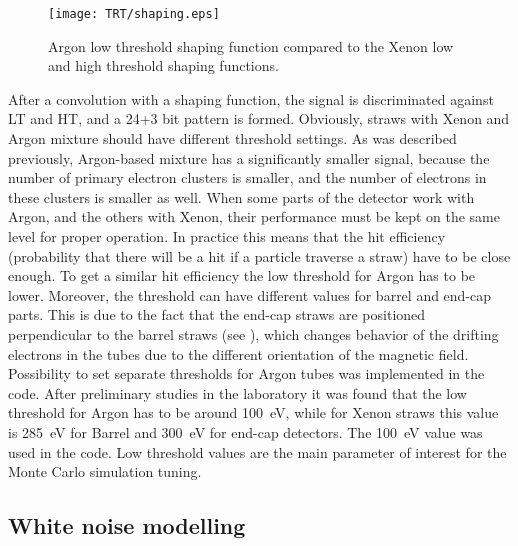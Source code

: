 \begin{figure}
\begin{center}
 \texttt{[image: TRT/shaping.eps]}
\caption{Argon low threshold shaping function compared to the Xenon low and high threshold shaping functions.}
\label{fig:shaping}
\end{center}
\end{figure}


After a convolution with a shaping function, the signal is discriminated against LT and HT, and a 24+3 bit pattern is formed.
Obviously, straws with Xenon and Argon mixture should have different threshold settings.
As was described previously, Argon-based mixture has a significantly smaller signal, because
the number of primary electron clusters is smaller, and the number of electrons in these clusters is smaller as well.
When some parts of the detector work with Argon, and the others with Xenon, their performance must be kept on the same level for
proper operation. In practice this means that the hit efficiency (probability that there will be a hit if a particle traverse a straw) have to be close enough. 
To get a similar hit efficiency the low threshold for Argon has to be lower.
Moreover, the threshold can have different values for barrel and end-cap parts. This is due to the fact that the end-cap straws are positioned perpendicular to the barrel straws (see ), %
which changes behavior of the drifting electrons in the tubes due to the different orientation of the magnetic field.
Possibility to set separate thresholds for Argon tubes was implemented in the code.
After preliminary studies in the laboratory it was found that the low threshold for Argon has to be around 100~eV, 
while for Xenon straws this value is 285~eV for Barrel and 300~eV for end-cap detectors. The 100~eV value was used in the code.
Low threshold values are the main parameter of interest for the Monte Carlo simulation tuning.

\subsection{White noise modelling}

